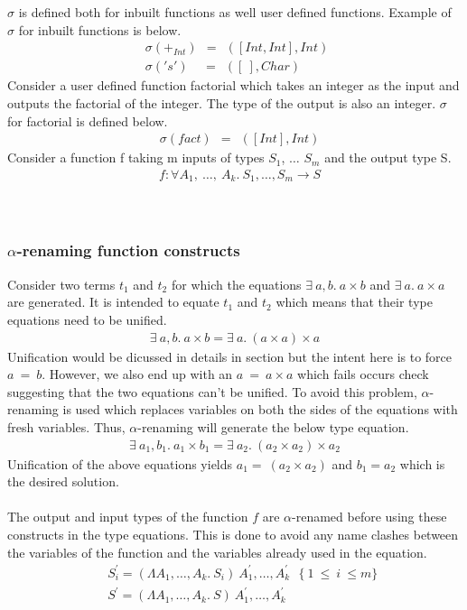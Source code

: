 \documentclass[11pt]{article}
\begin{document}
~~\\~~\\
$\sigma$ is defined both for inbuilt functions as well user defined functions. Example of $\sigma$ for inbuilt functions is below. 
\begin{align*}
    & \sigma (+_{Int}) ~~ = ~~ ([Int,Int],Int) ~~\\ 
    & \sigma ('s') ~~~~~ = ~~ ([~],Char)
\end{align*}
Consider a user defined function factorial which takes an integer as the input and outputs the factorial of the integer. The type of the output is also an integer. $\sigma$ for factorial is defined below.
\begin{align*}
    & \sigma (fact) ~~ = ~~ ([Int],Int)  
\end{align*}
Consider a function f taking m inputs of types $S_1$, $\ldots$ $S_m$ and the output type S. 
\begin{align*} 
 & f:\forall A_1,~ \ldots,~A_k.~S_1,\ldots,S_m \to S 
\end{align*}
~~\\~~\\
\subsubsection {$\alpha$-renaming function constructs}
 \label{alpha}
Consider two terms $t_1$ and $t_2$ for which the equations $\exists~a,b.~a \times b$ and $\exists~a.~a \times a$ are generated. It is intended to equate $t_1$ and $t_2$ which means that their type equations need to be unified. 
\begin{align}
     \exists~a,b.~a \times b = \exists~a.~(a \times a)\times a
 \end{align} 
Unification would be dicussed in details in section but the intent here is to force $a ~ = ~ b$. However, we also end up with an $a ~ = ~ a \times a $ which fails occurs check suggesting that the two equations can't be unified. To avoid this problem, $\alpha$-renaming is used which replaces variables on both the sides of the equations with fresh variables. Thus, $\alpha$-renaming will generate the below type equation.
\begin{align}
     \exists~a_1,b_1.~a_1 \times b_1 = \exists~a_2.~(a_2 \times a_2)\times a_2
 \end{align} 
Unification of the above equations yields $a_1 =~ (a_2 \times a_2)$ and $b_1 = a_2$ which is the desired solution.
~~\\~~\\
The output and input types of the function $f$ are $\alpha$-renamed before using these constructs in the type equations. This is done to avoid any name clashes between the variables of the function and the variables already used in the equation.
\begin{align*}
 & ~~ S_{i}^\prime = (\Lambda A_1,\ldots,A_k.~S_i)~A_1^{\prime},\ldots,A_k^{\prime} ~~~ \{~ 1~ \leq~ i~ \leq m\} \\
 & ~~ S^{\prime} = (\Lambda A_1,\ldots,A_k.~ S)~A_1^{\prime},\ldots,A_k^{\prime} 
 \end{align*}
\end{document}
